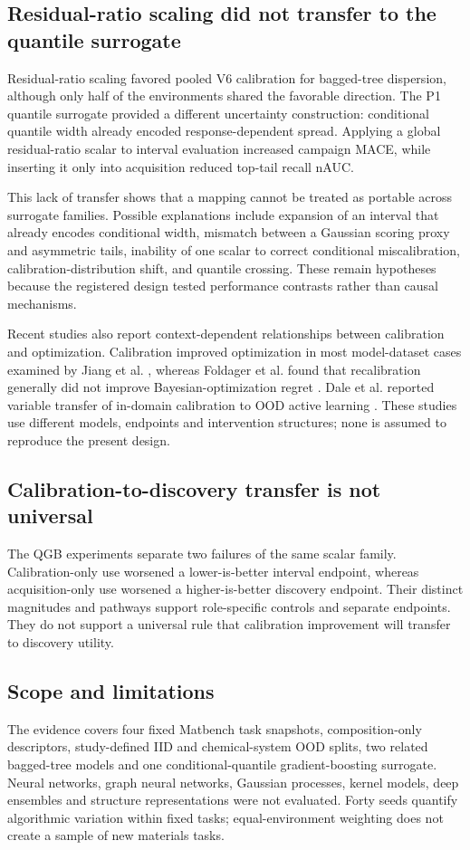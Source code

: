 \documentclass[10pt,twocolumn]{article}
\begin{document}
\subsection{Residual-ratio scaling did not transfer to the quantile surrogate}
Residual-ratio scaling favored pooled V6 calibration for bagged-tree dispersion, although only half of the environments shared the favorable direction. The P1 quantile surrogate provided a different uncertainty construction: conditional quantile width already encoded response-dependent spread. Applying a global residual-ratio scalar to interval evaluation increased campaign MACE, while inserting it only into acquisition reduced top-tail recall nAUC.

This lack of transfer shows that a mapping cannot be treated as portable across surrogate families. Possible explanations include expansion of an interval that already encodes conditional width, mismatch between a Gaussian scoring proxy and asymmetric tails, inability of one scalar to correct conditional miscalibration, calibration-distribution shift, and quantile crossing. These remain hypotheses because the registered design tested performance contrasts rather than causal mechanisms.

Recent studies also report context-dependent relationships between calibration and optimization. Calibration improved optimization in most model-dataset cases examined by Jiang et al. \citep{jiang2026calibration}, whereas Foldager et al. found that recalibration generally did not improve Bayesian-optimization regret \citep{foldager2023uncertainty}. Dale et al. reported variable transfer of in-domain calibration to OOD active learning \citep{dale2025ood}. These studies use different models, endpoints and intervention structures; none is assumed to reproduce the present design.

\subsection{Calibration-to-discovery transfer is not universal}
The QGB experiments separate two failures of the same scalar family. Calibration-only use worsened a lower-is-better interval endpoint, whereas acquisition-only use worsened a higher-is-better discovery endpoint. Their distinct magnitudes and pathways support role-specific controls and separate endpoints. They do not support a universal rule that calibration improvement will transfer to discovery utility.

\subsection{Scope and limitations}
The evidence covers four fixed Matbench task snapshots, composition-only descriptors, study-defined IID and chemical-system OOD splits, two related bagged-tree models and one conditional-quantile gradient-boosting surrogate. Neural networks, graph neural networks, Gaussian processes, kernel models, deep ensembles and structure representations were not evaluated. Forty seeds quantify algorithmic variation within fixed tasks; equal-environment weighting does not create a sample of new materials tasks.
\end{document}
